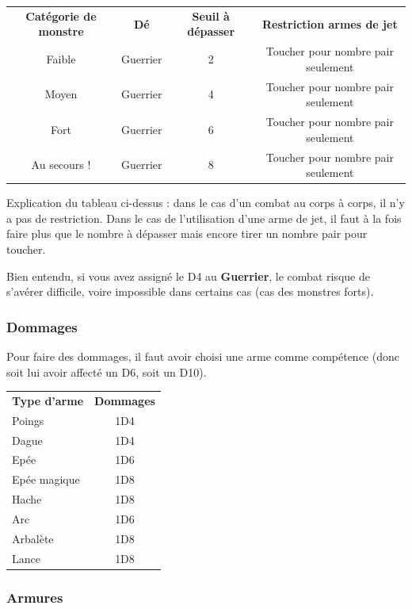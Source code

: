 \documentclass[a4paper, 11pt, twoside]{article}
\begin{document}
\begin{longtable}{cccc}
\textbf{Catégorie de monstre} & \textbf{Dé} & \textbf{Seuil à dépasser} & \textbf{Restriction armes de jet}\\
Faible & Guerrier & 2 & Toucher pour nombre pair seulement\\
Moyen & Guerrier & 4 & Toucher pour nombre pair seulement\\
Fort & Guerrier & 6 & Toucher pour nombre pair seulement\\
Au secours ! & Guerrier & 8 & Toucher pour nombre pair seulement\\
\end{longtable}

Explication du tableau ci-dessus : dans le cas d'un combat au corps à corps, il n'y a pas de restriction. Dans le cas de l'utilisation d'une arme de jet, il faut à la fois faire plus que le nombre à dépasser mais encore tirer un nombre pair pour toucher. 

Bien entendu, si vous avez assigné le D4 au \textbf{Guerrier}, le combat risque de s'avérer difficile, voire impossible dans certains cas (cas des monstres forts).

\newpage

\subsubsection{Dommages}
\label{sec:orgcb38310}

Pour faire des dommages, il faut avoir choisi une arme comme compétence (donc soit lui avoir affecté un D6, soit un D10).

\begin{longtable}{lc}
\textbf{Type d'arme} & \textbf{Dommages}\\
Poings & 1D4\\
Dague & 1D4\\
Epée & 1D6\\
Epée magique & 1D8\\
Hache & 1D8\\
Arc & 1D6\\
Arbalète & 1D8\\
Lance & 1D8\\
\end{longtable}

\subsubsection{Armures}
\label{sec:org2fc6096}
\end{document}
